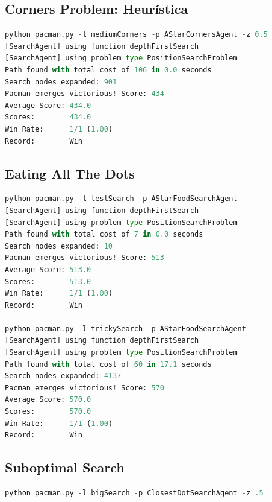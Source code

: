 \documentclass{report}
\begin{document}
        \clearpage\subsection{Corners Problem: Heurística}
          \begin{lstlisting}[language=Python, caption=Prueba Heurística Corners Problem]
python pacman.py -l mediumCorners -p AStarCornersAgent -z 0.5
[SearchAgent] using function depthFirstSearch
[SearchAgent] using problem type PositionSearchProblem
Path found with total cost of 106 in 0.0 seconds
Search nodes expanded: 901
Pacman emerges victorious! Score: 434
Average Score: 434.0
Scores:        434.0
Win Rate:      1/1 (1.00)
Record:        Win
          \end{lstlisting}
        \clearpage\subsection{Eating All The Dots}
          \begin{lstlisting}[language=Python, caption=Prueba Eating All The Dots]
python pacman.py -l testSearch -p AStarFoodSearchAgent
[SearchAgent] using function depthFirstSearch
[SearchAgent] using problem type PositionSearchProblem
Path found with total cost of 7 in 0.0 seconds
Search nodes expanded: 10
Pacman emerges victorious! Score: 513
Average Score: 513.0
Scores:        513.0
Win Rate:      1/1 (1.00)
Record:        Win

python pacman.py -l trickySearch -p AStarFoodSearchAgent
[SearchAgent] using function depthFirstSearch
[SearchAgent] using problem type PositionSearchProblem
Path found with total cost of 60 in 17.1 seconds
Search nodes expanded: 4137
Pacman emerges victorious! Score: 570
Average Score: 570.0
Scores:        570.0
Win Rate:      1/1 (1.00)
Record:        Win
          \end{lstlisting}
        \clearpage\subsection{Suboptimal Search}
          \begin{lstlisting}[language=Python, caption=Prueba Suboptimal Search]
python pacman.py -l bigSearch -p ClosestDotSearchAgent -z .5
          \end{lstlisting}
\end{document}
